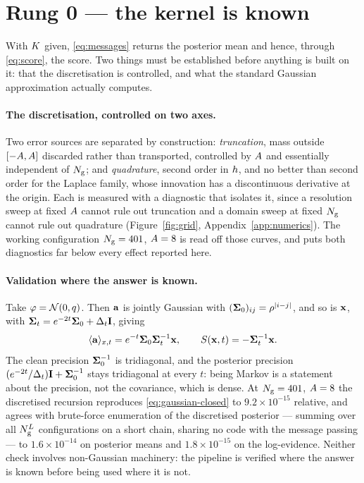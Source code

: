 \documentclass{article}
\begin{document}
\section{Rung 0 --- the kernel is known}
\label{sec:rung0}

With $K$ given, \eqref{eq:messages} returns the posterior mean and hence, through
\eqref{eq:score}, the score. Two things must be established before anything is built on it: that
the discretisation is controlled, and what the standard Gaussian approximation actually computes.

\paragraph{The discretisation, controlled on two axes.} Two error sources are separated by
construction: \emph{truncation}, mass outside $[-A,A]$ discarded rather than
transported, controlled by $A$ and essentially independent of $N_{\mathrm{g}}$; and
\emph{quadrature}, second order in $h$, and no better than second order for the Laplace
family, whose innovation has a discontinuous derivative at the origin. Each is measured with a
diagnostic that isolates it, since a resolution sweep at fixed $A$ cannot rule out
truncation and a domain sweep at fixed $N_{\mathrm{g}}$ cannot rule out quadrature
(Figure~\ref{fig:grid}, Appendix~\ref{app:numerics}). The working configuration $N_{\mathrm{g}}=401$,
$A=8$ is read off those curves, and puts both diagnostics far below every effect
reported here.

\paragraph{Validation where the answer is known.} Take $\varphi=\mathcal{N}\!\left(0,q\right)$. Then $\mathbf{a}$ is
jointly Gaussian with $(\mathbf{\Sigma}_0)_{ij}=\rho^{|i-j|}$, and so is $\mathbf{x}$, with
$\mathbf{\Sigma}_t = e^{-2t}\mathbf{\Sigma}_0 + \Delta_t \mathbf{I}$, giving
\begin{equation}
\label{eq:gaussian-closed}
\langle \mathbf{a} \rangle_{x,t} = e^{-t}\mathbf{\Sigma}_0\mathbf{\Sigma}_t^{-1}\mathbf{x},
\qquad
S(\mathbf{x},t) = -\mathbf{\Sigma}_t^{-1}\mathbf{x} .
\end{equation}
The clean precision $\mathbf{\Sigma}_0^{-1}$ is tridiagonal, and the posterior precision
$(e^{-2t}/\Delta_t)\mathbf{I} + \mathbf{\Sigma}_0^{-1}$ stays tridiagonal at every $t$: being Markov is a statement about
the precision, not the covariance, which is dense. At $N_{\mathrm{g}}=401$, $A=8$ the discretised
recursion reproduces \eqref{eq:gaussian-closed} to $9.2\times10^{-15}$ relative, and agrees with
brute-force enumeration of the discretised posterior --- summing over all $N_{\mathrm{g}}^{L}$
configurations on a short chain, sharing no code with the message passing --- to
$1.6\times10^{-14}$ on posterior means and $1.8\times10^{-15}$ on the log-evidence. Neither check
involves non-Gaussian machinery: the pipeline is verified where the answer is known before being
used where it is not.
\end{document}
